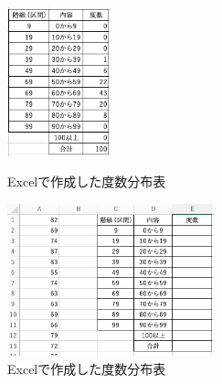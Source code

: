 \begin{figure}[htbp]
    \begin{minipage}{0.5\hsize}
        \centering
        \includegraphics[width=3cm]{chap1/freq.png}
        \caption{Excelで作成した度数分布表}
        \label{fig:freq}
    \end{minipage}
    \begin{minipage}{0.5\hsize}
        \centering
        \includegraphics[width=6cm]{chap1/before_freq.png}
        \caption{Excelで作成した度数分布表}
        \label{fig:before_freq}
    \end{minipage}
\end{figure}


